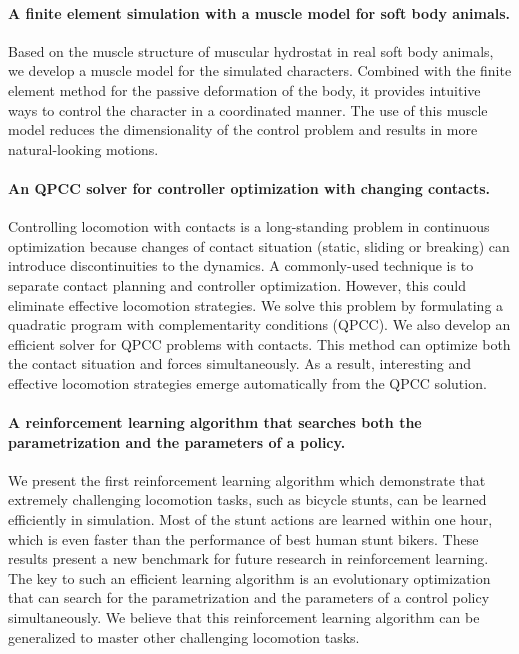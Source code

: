 \paragraph{A finite element simulation with a muscle model for soft body animals.} Based on the muscle structure of muscular hydrostat in real soft body animals, we develop a muscle model for the simulated characters. Combined with the finite element method for the passive deformation of the body, it provides intuitive ways to control the character in a coordinated manner. The use of this muscle model reduces the dimensionality of the control problem and results in more natural-looking motions.

\paragraph{An QPCC solver for controller optimization with changing contacts.} Controlling locomotion with contacts is a long-standing problem in continuous optimization because changes of contact situation (static, sliding or breaking) can introduce discontinuities to the dynamics. A commonly-used technique is to separate contact planning and controller optimization. However, this could eliminate effective locomotion strategies. We solve this problem by formulating a quadratic program with complementarity conditions (QPCC). We also develop an efficient solver for QPCC problems with contacts. This method can optimize both the contact situation and forces simultaneously. As a result, interesting and effective locomotion strategies emerge automatically from the QPCC solution.

\paragraph{A reinforcement learning algorithm that searches both the parametrization and the parameters of a policy.} We present the first reinforcement learning algorithm which demonstrate that extremely challenging locomotion tasks, such as bicycle stunts, can be learned efficiently in simulation. Most of the stunt actions are learned within one hour, which is even faster than the performance of best human stunt bikers. These results present a new benchmark for future research in reinforcement learning. The key to such an efficient learning algorithm is an evolutionary optimization that can search for the parametrization and the parameters of a control policy simultaneously. We believe that this reinforcement learning algorithm can be generalized to master other challenging locomotion tasks.

